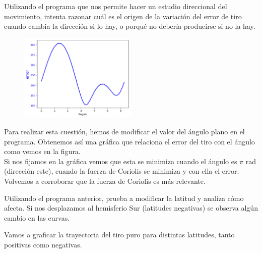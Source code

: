 \documentclass[11pt]{article}
\newcommand{\laputa}[1]{\begin{note}{#1}{}\end{note}}
\begin{document}
        \vspace{-0.2cm}
        \laputa{Utilizando el programa que nos permite hacer un estudio direccional del movimiento, intenta razonar cuál es el origen de la variación del error de tiro cuando cambia la dirección si lo hay, o porqué no debería producirse si no la hay.}
        
            \begin{figure}
                \vspace{-0.4cm}
                \centering
                \includegraphics[width=0.5\textwidth]{fotos/gráficas/pregunta2.png}
            \end{figure}
            
            \vspace{0.1cm}\noindent Para realizar esta cuestión, hemos de modificar el valor del ángulo plano en el programa. Obtenemos así una gráfica que relaciona el error del tiro con el ángulo como vemos en la figura.\\
            
            \noindent Si nos fijamos en la gráfica vemos que esta se minimiza cuando el ángulo es $\pi$ rad (dirección este), cuando la fuerza de Coriolis se minimiza y con ella el error. Volvemos a corroborar que la fuerza de Coriolis es más relevante.\\

        \vspace{-0.4cm}
        \laputa{Utilizando el programa anterior, prueba a modificar la latitud y analiza cómo afecta. Si nos desplazamos al hemisferio Sur (latitudes negativas) se observa algún cambio en las curvas.}

            \noindent Vamos a graficar la trayectoria del tiro puro para distintas latitudes, tanto positivas como negativas.
            
\end{document}
